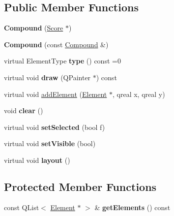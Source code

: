 \subsection*{Public Member Functions}
\begin{DoxyCompactItemize}
\item 
\mbox{\label{class_ms_1_1_compound_ab583681b16c06ff941134efb5fa63a6a}} 
{\bfseries Compound} (\hyperlink{class_ms_1_1_score}{Score} $\ast$)
\item 
\mbox{\label{class_ms_1_1_compound_a0c78fa7594cf245d977109ab3d3a3e49}} 
{\bfseries Compound} (const \hyperlink{class_ms_1_1_compound}{Compound} \&)
\item 
\mbox{\label{class_ms_1_1_compound_a7d9db768ba5532f7ec66857322aaa59d}} 
virtual Element\+Type {\bfseries type} () const =0
\item 
\mbox{\label{class_ms_1_1_compound_ac2c7952a28007a6666161e56b5402c00}} 
virtual void {\bfseries draw} (Q\+Painter $\ast$) const
\item 
virtual void \hyperlink{class_ms_1_1_compound_a4287650988d7130a7e38414ba714b5ea}{add\+Element} (\hyperlink{class_ms_1_1_element}{Element} $\ast$, qreal x, qreal y)
\item 
\mbox{\label{class_ms_1_1_compound_a59253fc7dba61bb14fae24ac6037d9dc}} 
void {\bfseries clear} ()
\item 
\mbox{\label{class_ms_1_1_compound_ab0bfc1f2bae7c227026ecb1d8e031760}} 
virtual void {\bfseries set\+Selected} (bool f)
\item 
\mbox{\label{class_ms_1_1_compound_a122416455ba19e75c19fc263b2f464bf}} 
virtual void {\bfseries set\+Visible} (bool)
\item 
\mbox{\label{class_ms_1_1_compound_afe44d6553250a4911fad0f9e013d5f5d}} 
virtual void {\bfseries layout} ()
\end{DoxyCompactItemize}
\subsection*{Protected Member Functions}
\begin{DoxyCompactItemize}
\item 
\mbox{\label{class_ms_1_1_compound_a49eafa48414fdd6d65fc93c025332dce}} 
const Q\+List$<$ \hyperlink{class_ms_1_1_element}{Element} $\ast$ $>$ \& {\bfseries get\+Elements} () const
\end{DoxyCompactItemize}

